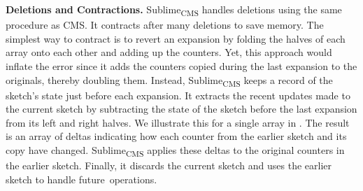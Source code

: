 \documentclass[sigconf]{acmart}
\newcommand{\sketch}{Sublime}
\newcommand{\sketchcms}{\sketch\textsubscript{CMS}\xspace}
\begin{document}
\textbf{Deletions and Contractions.} 
\sketchcms handles deletions using the same procedure as CMS.
It contracts after many deletions to save memory.
The simplest way to contract is to revert an expansion by folding the halves of each array onto each other and adding up the counters.
Yet, this approach would inflate the error since it adds the counters copied during the last expansion to the originals, thereby doubling them.
Instead, \sketchcms keeps a record of the sketch's state just before each expansion.
It extracts the recent updates made to the current sketch by subtracting the state of the sketch before the last expansion from its left and right halves.
We illustrate this for a single array in .
The result is an array of deltas indicating how each counter from the earlier sketch and its copy have changed.
\sketchcms applies these deltas to the original counters in the earlier sketch.
Finally, it discards the current sketch and uses the earlier sketch to handle future~operations.
\end{document}
